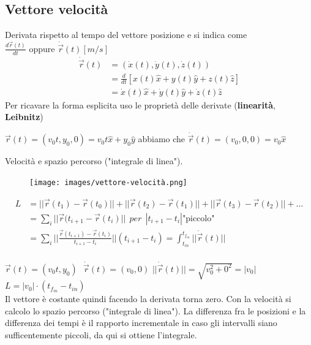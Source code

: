 \subsection*{Vettore velocità}
Derivata rispetto al tempo del vettore posizione e si indica come 
$\frac{d\vec{r}(t)}{dt}\text{ oppure }\dot{\vec{r}}(t)[m/s]$
\begin{equation}
    \begin{split}
    \dot{\vec{r}}(t) & = (\dot{x}(t), \dot{y}(t), \dot{z}(t)) \\
     & = \frac{d}{dt}[x(t)\hat{x} + y(t)\hat{y} + z(t)\hat{z}] \\
     & = \dot{x}(t)\hat{x} + \dot{y}(t)\hat{y} + \dot{z}(t)\hat{z}
    \end{split}
\end{equation}
Per ricavare la forma esplicita uso le proprietà delle derivate (\textbf{linearità}, \textbf{Leibnitz})
\begin{example}
    $\vec{r}(t) = (v_0t, y_0, 0) = v_0t\hat{x} + y_0\hat{y}$ \:\:\:abbiamo che \:\:\:
    $\dot{\vec{r}}(t) = (v_0, 0, 0) = v_0 \hat{x}$
\end{example}
\hspace{-15pt}Velocità e spazio percorso ("integrale di linea").\\
\begin{figure}
    \centering
    \texttt{[image: images/vettore-velocità.png]}
\end{figure}
\begin{align*}
    L & = ||\vec{r}(t_1) - \vec{r}(t_0)|| + ||\vec{r}(t_2) - \vec{r}(t_1)|| + ||\vec{r}(t_3) - \vec{r}(t_2)|| + \dots \\
    & = \sum_i ||\vec{r}(t_{i+1} - \vec{r}(t_i)|| \:\: per\:\: |t_{i+1} - t_i| \text{"piccolo"} \\
    & = \sum_i ||\frac{\vec{r}(t_{i+1}) - \vec{r}(t_i)}{t_{i+1} - t_i}|| (t_{i+1} - t_i) = \int_{t_{in}}^{t_{f_{in}}}||\dot{\vec{r}}(t)||\\
\end{align*}
\begin{example}
    $\vec{r}(t) = (v_0t, y_0)\:\:\: \dot{\vec{r}}(t) = (v_0, 0)$\hspace{15pt}
    $||\dot{\vec{r}}(t)|| = \sqrt{v_0^2 + 0^2} = |v_0|$ \:\:\: $L = |v_0| \cdot (t_{f_{in}} - t_{in})$\\
    Il vettore è costante quindi facendo la derivata torna zero. Con la velocità si calcolo lo spazio percorso ("integrale di linea").
    La differenza fra le posizioni e la differenza dei tempi è il rapporto incrementale in caso gli intervalli siano sufficentemente
    piccoli, da qui si ottiene l'integrale.
\end{example}

